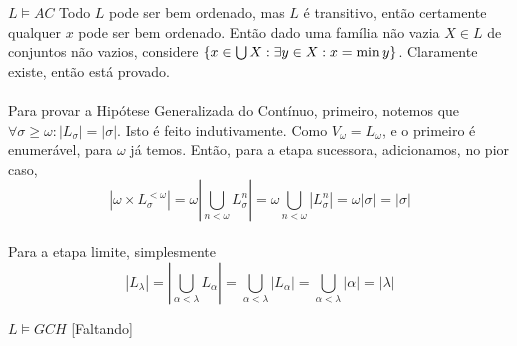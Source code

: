             \begin{theorem}{$L\vDash AC$}
                Todo $L$ pode ser bem ordenado, mas $L$ é transitivo, então certamente qualquer $x$ pode ser bem ordenado. Então 
                dado uma família não vazia $X\in L$ de conjuntos não vazios, considere 
                $\SET{x\in \bigcup X: \exists y\in X: x = \min{y}}$. Claramente existe, então está provado.\eop
            \end{theorem}
            \paragraph{}
                Para provar a Hipótese Generalizada do Contínuo, primeiro, notemos que $\forall\sigma\geq\omega:|L_\sigma| = |\sigma|$.
                Isto é feito indutivamente. Como $V_\omega = L_\omega$, e o primeiro é enumerável, para $\omega$ já temos. Então, para 
                a etapa sucessora, adicionamos, no pior caso, 
                $$|\omega\times L_\sigma^{<\omega}|=\omega|\bigcup_{n<\omega}L_\sigma^n| = \omega\bigcup_{n<\omega}|L_\sigma^n| = \omega|\sigma| = |\sigma|$$
            \paragraph{}
                Para a etapa limite, simplesmente $$|L_\lambda| = |\bigcup_{\alpha < \lambda}L_\alpha| = \bigcup_{\alpha<\lambda}|L_\alpha| = \bigcup_{\alpha<\lambda}|\alpha| = |\lambda|$$
            \begin{theorem}{$L\vDash GCH$}
                [Faltando]
            \end{theorem}
            

